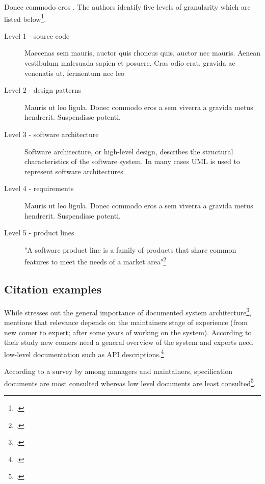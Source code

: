 Donec commodo eros . The
authors identify five levels of granularity which are listed
below\footcite[Cf.][98]{huang_towards_2003}.

\begin{description}
	\item[Level 1 - source code] Maecenas sem mauris, auctor quis rhoncus
	     quis, auctor nec mauris. Aenean vestibulum malesuada sapien et
	     posuere. Cras odio erat, gravida ac venenatis ut, fermentum nec
	     leo

	\item[Level 2 - design patterns] Mauris ut leo ligula. Donec commodo
	     eros a sem viverra a gravida metus hendrerit. Suspendisse
	     potenti.

	\item[Level 3 - software architecture] Software architecture, or
	     high-level design, describes the structural characteristics of the
	     software system. In many cases UML is used to represent software
	     architectures.

	\item[Level 4 - requirements] Mauris ut leo ligula. Donec commodo eros
	     a sem viverra a gravida metus hendrerit. Suspendisse potenti.

	\item[Level 5 - product lines] "A software product line is a family of
	     products that share common features to meet the needs of a market
	     area"\footcite[][]{ardis_et_al_2000}
\end{description}


\subsection{Citation examples}
\label{sec:relevance_of_documentation}


While \citeauthor{tilley_1992} stresses out the general importance of documented
system architecture\footcite[Cf.][]{tilley_1992}, 
\citeauthor{cioch_96} mentions that relevance depends on the
maintainers stage of experience (from new comer to expert; after some years of
working on the system). According to their study new comers need a general
overview of the system and experts need low-level documentation such as API
descriptions.\footcite[Cf.][]{cioch_96}

According to a survey by \citeauthor{forward_relevance_2002} among managers and
maintainers, specification documents are most consulted whereas low level
documents are least consulted\footcite[Cf.][28-30]{forward_relevance_2002}.


